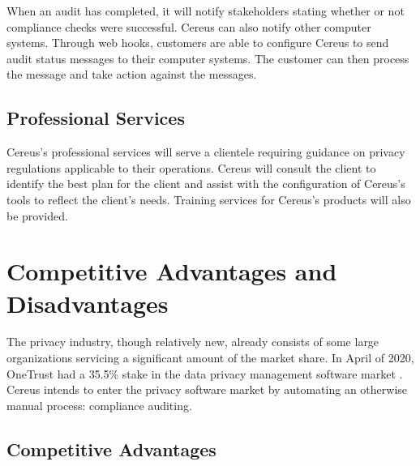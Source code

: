 When an audit has completed, it will notify stakeholders stating whether or not compliance checks were successful. Cereus can also notify other computer systems. Through web hooks, customers are able to configure Cereus to send audit status messages to their computer systems. The customer can then process the message and take action against the messages.

\subsection{Professional Services}

Cereus's professional services will serve a clientele requiring guidance on privacy regulations applicable to their operations. Cereus will consult the client to identify the best plan for the client and assist with the configuration of Cereus's tools to reflect the client's needs. Training services for Cereus's products will also be provided.

\section{Competitive Advantages and Disadvantages}

The privacy industry, though relatively new, already consists of some large organizations servicing a significant amount of the market share. In April of 2020, OneTrust had a 35.5\% stake in the data privacy management software market \cite{onetrust.2020}. Cereus intends to enter the privacy software market by automating an otherwise manual process: compliance auditing.

\subsection{Competitive Advantages}

